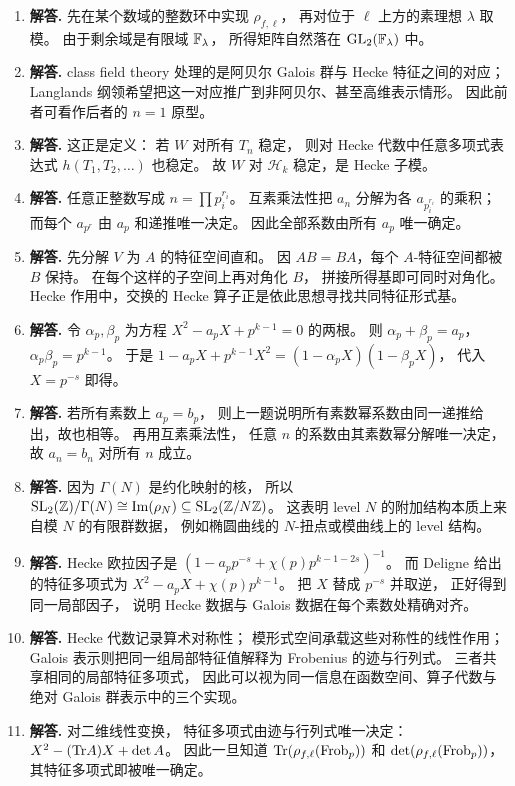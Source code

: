 \begin{enumerate}[label=\textbf{\arabic*.}, leftmargin=*, itemsep=1em]
\item \textbf{解答.} 先在某个数域的整数环中实现 $\rho_{f,\ell}$， 再对位于 $\ell$ 上方的素理想 $\lambda$ 取模。 由于剩余域是有限域 $\mathbb{F}_\lambda$， 所得矩阵自然落在 $\mathrm{GL}_2(\mathbb{F}_\lambda)$ 中。
\item \textbf{解答.} class field theory 处理的是阿贝尔 Galois 群与 Hecke 特征之间的对应； Langlands 纲领希望把这一对应推广到非阿贝尔、甚至高维表示情形。 因此前者可看作后者的 $n=1$ 原型。
\item \textbf{解答.} 这正是定义： 若 $W$ 对所有 $T_n$ 稳定， 则对 Hecke 代数中任意多项式表达式 $h(T_1,T_2,\dots)$ 也稳定。 故 $W$ 对 $\mathcal{H}_k$ 稳定，是 Hecke 子模。
\item \textbf{解答.} 任意正整数写成 $n=\prod p_i^{r_i}$。 互素乘法性把 $a_n$ 分解为各 $a_{p_i^{r_i}}$ 的乘积； 而每个 $a_{p^r}$ 由 $a_p$ 和递推唯一决定。 因此全部系数由所有 $a_p$ 唯一确定。
\item \textbf{解答.} 先分解 $V$ 为 $A$ 的特征空间直和。 因 $AB=BA$，每个 $A$-特征空间都被 $B$ 保持。 在每个这样的子空间上再对角化 $B$， 拼接所得基即可同时对角化。 Hecke 作用中，交换的 Hecke 算子正是依此思想寻找共同特征形式基。
\item \textbf{解答.} 令 $\alpha_p,\beta_p$ 为方程 $X^2-a_pX+p^{k-1}=0$ 的两根。 则 $\alpha_p+\beta_p=a_p$， $\alpha_p\beta_p=p^{k-1}$。 于是 $1-a_pX+p^{k-1}X^2=(1-\alpha_pX)(1-\beta_pX)$， 代入 $X=p^{-s}$ 即得。
\item \textbf{解答.} 若所有素数上 $a_p=b_p$， 则上一题说明所有素数幂系数由同一递推给出，故也相等。 再用互素乘法性， 任意 $n$ 的系数由其素数幂分解唯一决定， 故 $a_n=b_n$ 对所有 $n$ 成立。
\item \textbf{解答.} 因为 $\Gamma(N)$ 是约化映射的核， 所以 $\mathrm{SL}_2(\mathbb{Z})/\Gamma(N)\cong \mathrm{Im}(\rho_N)\subseteq \mathrm{SL}_2(\mathbb{Z}/N\mathbb{Z})$。 这表明 level $N$ 的附加结构本质上来自模 $N$ 的有限群数据， 例如椭圆曲线的 $N$-扭点或模曲线上的 level 结构。
\item \textbf{解答.} Hecke 欧拉因子是 $(1-a_pp^{-s}+\chi(p)p^{k-1-2s})^{-1}$。 而 Deligne 给出的特征多项式为 $X^2-a_pX+\chi(p)p^{k-1}$。 把 $X$ 替成 $p^{-s}$ 并取逆， 正好得到同一局部因子， 说明 Hecke 数据与 Galois 数据在每个素数处精确对齐。
\item \textbf{解答.} Hecke 代数记录算术对称性； 模形式空间承载这些对称性的线性作用； Galois 表示则把同一组局部特征值解释为 Frobenius 的迹与行列式。 三者共享相同的局部特征多项式， 因此可以视为同一信息在函数空间、算子代数与绝对 Galois 群表示中的三个实现。
\item \textbf{解答.} 对二维线性变换， 特征多项式由迹与行列式唯一决定： $X^2-(\mathrm{Tr} A)X+\det A$。 因此一旦知道 $\mathrm{Tr}(\rho_{f,\ell}(\mathrm{Frob}_p))$ 和 $\det(\rho_{f,\ell}(\mathrm{Frob}_p))$， 其特征多项式即被唯一确定。

\end{enumerate}
